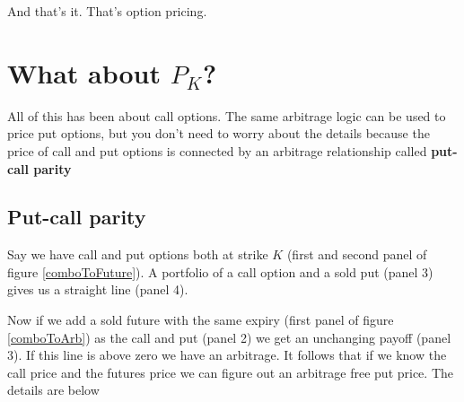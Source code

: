 

And that's it. That's option pricing. 

\section{What about $P_K$?}

All of this has been about call options. The same arbitrage logic can be used to price put options, but you don't need to worry about the details because the price of call and put options is connected by an arbitrage relationship called \textbf{put-call parity}

\subsection{Put-call parity}

Say we have call and put options both at strike $K$ (first and second panel of figure \ref{comboToFuture}). A portfolio of a call option and a sold put (panel 3) gives us a straight line (panel 4). 

Now if we add a sold future with the same expiry (first panel of figure \ref{comboToArb}) as the call and put (panel 2) we get an unchanging payoff (panel 3). If this line is above zero we have an arbitrage. It follows that if we know the call price and the futures price we can figure out an arbitrage free put price. The details are below

